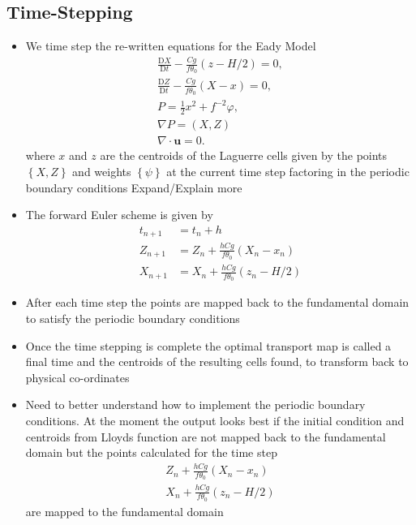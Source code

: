 \documentclass[]{article}
\begin{document}
 	\subsection{Time-Stepping}
 	\begin{itemize}
 		\item We time step the re-written equations for the Eady Model \cite{Cullen2008}
 		\begin{align*}
 		\frac{\textrm{D}X}{\textrm{D}t} - \frac{Cg}{f\theta_0}\left(z-H/2\right) = 0,
 		\\
 		\frac{\textrm{D}Z}{\textrm{D}t} - \frac{Cg}{f\theta_0}\left(X-x\right) = 0,
 		\\
 		P = \frac{1}{2}x^2 + f^{-2}\varphi,
 		\\
 		\nabla P = (X,Z)
 		\\
 		\nabla \cdot \bm{u} =0.
 		\end{align*}
 	where $x$ and $z$ are the centroids of the Laguerre cells given by the points $\left\lbrace X,Z\right\rbrace $ and weights $\left\lbrace \psi \right\rbrace $ at the current time step factoring in the periodic boundary conditions \color{red} Expand/Explain more \color{black}
 	\item The forward Euler scheme is given by 
 	\begin{align*}
 		t_{n+1} &= t_n + h\\
 		Z_{n+1} &= Z_n + \frac{hCg}{f\theta_0}\left(X_n-x_n\right)\\
 		X_{n+1} &= X_n + \frac{hCg}{f\theta_0}\left(z_n-H/2\right)
 	\end{align*}
 	\item After each time step the points are mapped back to the fundamental domain to satisfy the periodic boundary conditions
 	\item Once the time stepping is complete the optimal transport map is called a final time and the centroids of the resulting cells found, to transform back to physical co-ordinates
 	\item \color{red} Need to better understand how to implement the periodic boundary conditions. At the moment the output looks best if the initial condition and centroids from Lloyds function are not mapped back to the fundamental domain but the points calculated for the time step  
 	\begin{align*}
 	Z_n + \frac{hCg}{f\theta_0}\left(X_n-x_n\right)\\
 	X_n + \frac{hCg}{f\theta_0}\left(z_n-H/2\right)
 	\end{align*}
 	are mapped to the fundamental domain
 	\end{itemize}
\end{document}
